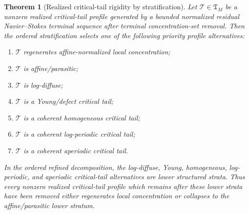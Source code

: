 \documentclass[11pt]{amsart}
\numberwithin{equation}{section}
\theoremstyle{plain}
\newtheorem{theorem}{Theorem}[section]
\theoremstyle{definition}
\theoremstyle{remark}
\newcommand{\Tcrit}{\mathfrak T_M}
\begin{document}
\begin{theorem}[Realized critical-tail rigidity by stratification]
\label{thm:realized-critical-tail-rigidity}
Let \(\mathcal T\in\Tcrit\) be a nonzero realized
critical-tail profile generated by a bounded normalized residual Navier--Stokes
terminal sequence after terminal concentration-set removal.  Then the ordered
stratification selects one of the following priority profile alternatives:
\begin{enumerate}[label=\textup{(\alph*)}]
   \item \(\mathcal T\) regenerates affine-normalized local concentration;
   \item \(\mathcal T\) is affine/parasitic;
   \item \(\mathcal T\) is log-diffuse;
   \item \(\mathcal T\) is a Young/defect critical tail;
   \item \(\mathcal T\) is a coherent homogeneous critical tail;
   \item \(\mathcal T\) is a coherent log-periodic critical tail;
   \item \(\mathcal T\) is a coherent aperiodic critical tail.
\end{enumerate}
In the ordered refined decomposition, the log-diffuse, Young, homogeneous,
log-periodic, and aperiodic critical-tail alternatives are lower structured strata.
Thus every nonzero realized critical-tail profile which remains after these
lower strata have been removed either regenerates local concentration or collapses
to the affine/parasitic lower stratum.
\end{theorem}
\end{document}
